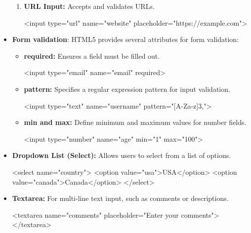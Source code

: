 \documentclass{report}
\begin{document}
\begin{itemize}
\begin{enumerate}
            \item \textbf{URL Input:} Accepts and validates URLs.
                \bigbreak \noindent 
                \begin{htmlcode}
                    <input type="url" name="website" placeholder="https://example.com">
                \end{htmlcode}
        \end{enumerate}
    \item \textbf{Form validation}: HTML5 provides several attributes for form validation:
        \begin{itemize}
            \item \textbf{required:} Ensures a field must be filled out.
                \bigbreak \noindent 
                \begin{htmlcode}
                    <input type="email" name="email" required>
                \end{htmlcode}
            \item \textbf{pattern:} Specifies a regular expression pattern for input validation.
                \bigbreak \noindent 
                \begin{htmlcode}
                    <input type="text" name="username" pattern="[A-Za-z]{3,}">
                \end{htmlcode}
            \item \textbf{min and max:} Define minimum and maximum values for number fields.
                \bigbreak \noindent 
                \begin{htmlcode}
                    <input type="number" name="age" min="1" max="100">
                \end{htmlcode}
        \end{itemize}
    \item \textbf{Dropdown List (Select):} Allows users to select from a list of options.
        \bigbreak \noindent 
        \begin{htmlcode}
            <select name="country">
                <option value="usa">USA</option>
                <option value="canada">Canada</option>
            </select>
        \end{htmlcode}
    \item \textbf{Textarea:} For multi-line text input, such as comments or descriptions.
        \bigbreak \noindent 
        \begin{htmlcode}
            <textarea name="comments" placeholder="Enter your comments"></textarea>
        \end{htmlcode}

\end{itemize}
\end{document}

